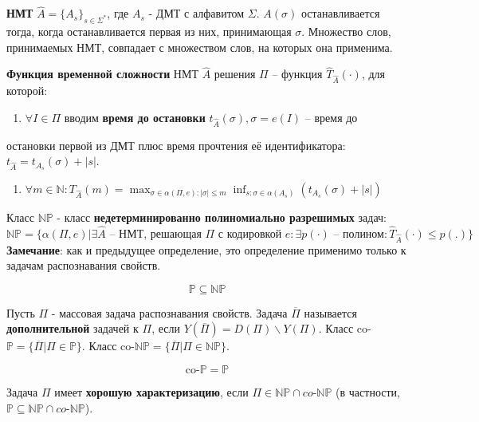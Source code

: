 \documentclass[11pt]{article}
\newcounter{th}\setcounter{th}{0}
\newcounter{stnmt}\setcounter{stnmt}{0}
\def\st{\par\smallskip\refstepcounter{stnmt}\textbf{\arabic{stnmt}}}
\newtheorem*{Statement}{Утверждение \st}
\begin{document}
\textbf{НМТ} \(\hat{A} = \{A_s\}_{s \in \Sigma^*}\), где \(A_s\) - ДМТ с алфавитом \(\Sigma\).
\(A(\sigma)\) останавливается тогда, когда останавливается первая из них, принимающая \(\sigma\).
Множество слов, принимаемых НМТ, совпадает с множеством слов, на которых она применима.

\textbf{Функция временной сложности} НМТ \(\hat{A}\) решения \(\Pi\) -- функция \(\hat{T}_{\hat A}(\cdot)\), для которой:
\begin{enumerate}
\item \(\forall I \in \Pi\) вводим \textbf{время до остановки} \(t_{\hat{A}}(\sigma), \sigma = e(I)\) -- время до
\end{enumerate}
остановки первой из ДМТ плюс время прочтения её идентификатора: \(t_{\hat{A}} = t_{A_s}(\sigma) + |s|\).
\begin{enumerate}
\item \(\forall m \in \mathbb{N}: T_{\hat{A}}(m) = \max_{\sigma \in \alpha(\Pi, e): |\sigma| \leq m}\inf_{s: \sigma \in \alpha(A_s)}(t_{A_s}(\sigma) + |s|)\)
\end{enumerate}

Класс \(\mathbb{NP}\) - класс \textbf{недетерминированно полиномиально разрешимых} задач:
\begin{equation*}
\mathbb{NP} = \{\alpha(\Pi, e) | \exists \hat{A} \text{ -- НМТ, решающая } \Pi \text{ с кодировкой } e:
\exists p(\cdot) \text{ -- полином}: \hat{T}_{\hat{A}}(\cdot) \leq p(.)\}
\end{equation*}
\textbf{Замечание}: как и предыдущее определение, это определение применимо только к задачам
распознавания свойств.
\begin{Statement}
\begin{equation*}
\mathbb{P} \subseteq \mathbb{NP}
\end{equation*}
\end{Statement}
Пусть \(\Pi\) - массовая задача распознавания свойств. Задача \(\overline{\Pi}\) называется
\textbf{дополнительной} задачей к \(\Pi\), если \(Y(\overline{\Pi}) = D(\Pi) \backslash Y(\Pi)\).
Класс co-\(\mathbb{P} = \{\overline{\Pi} | \Pi \in \mathbb{P}\}\).
Класс co-\(\mathbb{NP} = \{\overline{\Pi} | \Pi \in \mathbb{NP}\}\).
\begin{Statement}
\begin{equation*}
\text{co-}\mathbb{P} = \mathbb{P}
\end{equation*}
\end{Statement}
Задача \(\Pi\) имеет \textbf{хорошую характеризацию}, если \(\Pi \in \mathbb{NP} \cap \textit{co-}\mathbb{NP}\)
(в частности, \(\mathbb{P} \subseteq \mathbb{NP} \cap \textit{co-}\mathbb{NP}\)).
\end{document}
